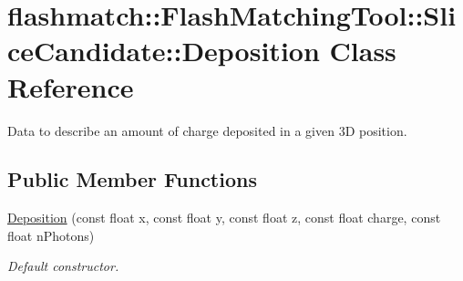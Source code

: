 \hypertarget{classflashmatch_1_1FlashMatchingTool_1_1SliceCandidate_1_1Deposition}{\section{flashmatch\-:\-:Flash\-Matching\-Tool\-:\-:Slice\-Candidate\-:\-:Deposition Class Reference}
\label{classflashmatch_1_1FlashMatchingTool_1_1SliceCandidate_1_1Deposition}
}


Data to describe an amount of charge deposited in a given 3\-D position.  


\subsection*{Public Member Functions}
\begin{DoxyCompactItemize}
\item 
\hyperlink{classflashmatch_1_1FlashMatchingTool_1_1SliceCandidate_1_1Deposition_a1a82b8b017a69608daf16cd067c6e991}{Deposition} (const float x, const float y, const float z, const float charge, const float n\-Photons)
\begin{DoxyCompactList}\small\item\em Default constructor. \end{DoxyCompactList}\end{DoxyCompactItemize}
